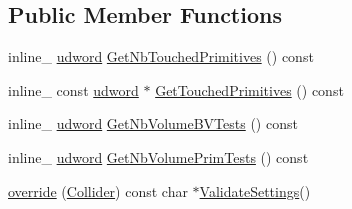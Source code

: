\subsection*{Public Member Functions}
\begin{DoxyCompactItemize}
\item 
inline\+\_\+ \hyperlink{IceTypes_8h_a44c6f1920ba5551225fb534f9d1a1733}{udword} \hyperlink{classVolumeCollider_a274b51032b2c2e4394b1cc9308fa8d71}{Get\+Nb\+Touched\+Primitives} () const 
\item 
inline\+\_\+ const \hyperlink{IceTypes_8h_a44c6f1920ba5551225fb534f9d1a1733}{udword} $\ast$ \hyperlink{classVolumeCollider_afca0d34cb9f4aa27537a4bfd03fe40d9}{Get\+Touched\+Primitives} () const 
\item 
inline\+\_\+ \hyperlink{IceTypes_8h_a44c6f1920ba5551225fb534f9d1a1733}{udword} \hyperlink{classVolumeCollider_a682b0bcfb8d5fbb96591909b6bae6276}{Get\+Nb\+Volume\+B\+V\+Tests} () const 
\item 
inline\+\_\+ \hyperlink{IceTypes_8h_a44c6f1920ba5551225fb534f9d1a1733}{udword} \hyperlink{classVolumeCollider_a752c69151ed1070abbb6fb68b5f4376a}{Get\+Nb\+Volume\+Prim\+Tests} () const 
\item 
\hyperlink{classVolumeCollider_a785ddb7e78cd48ff30179703f5c7285a}{override} (\hyperlink{classCollider}{Collider}) const char $\ast$\hyperlink{classCollider_a225d4861b2184336433894174c6e3e2d}{Validate\+Settings}()
\end{DoxyCompactItemize}
